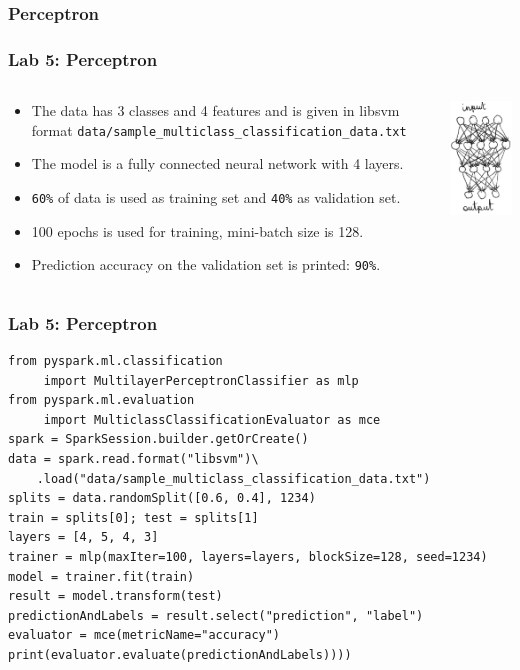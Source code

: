 \subsubsection{Perceptron}
\begin{frame}[fragile]
\frametitle{Lab 5: Perceptron}
\begin{columns}
\begin{column}{.75\textwidth}
\begin{itemize}
\item The data has 3 classes and 4 features and is given in libsvm format 
  {\small{\color{mycolorcli}\verb|data/sample_multiclass_classification_data.txt|}}
\item The model is a fully connected neural network with 4 layers.
\item \verb|60%| of data is used as training set and \verb|40%| as validation set.
\item 100 epochs is used for training, mini-batch size is 128.
\item Prediction accuracy on the validation set is printed: \verb|90%|.
\end{itemize}
\end{column}

\begin{column}{.25\textwidth}
\includegraphics[width=3cm]{graphs/perceptron.jpg}
\end{column}


\end{columns}

\end{frame}


\begin{frame}[fragile]
\frametitle{Lab 5: Perceptron}
{\small
{\color{mycolorcode}
\begin{verbatim}
from pyspark.ml.classification 
     import MultilayerPerceptronClassifier as mlp
from pyspark.ml.evaluation 
     import MulticlassClassificationEvaluator as mce
spark = SparkSession.builder.getOrCreate()
data = spark.read.format("libsvm")\
    .load("data/sample_multiclass_classification_data.txt")
splits = data.randomSplit([0.6, 0.4], 1234)
train = splits[0]; test = splits[1]
layers = [4, 5, 4, 3]
trainer = mlp(maxIter=100, layers=layers, blockSize=128, seed=1234)
model = trainer.fit(train)
result = model.transform(test)
predictionAndLabels = result.select("prediction", "label")
evaluator = mce(metricName="accuracy")
print(evaluator.evaluate(predictionAndLabels))))
\end{verbatim}
}
}
\end{frame}
